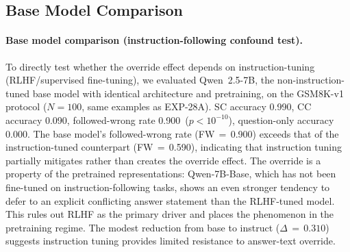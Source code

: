 \documentclass{article}
\theoremstyle{definition}
\theoremstyle{definition}
\newcommand{\QWSBVONEFW}{0.590}
\newcommand{\QBASEVONESCACC}{0.990}
\newcommand{\QBASEVONECCACC}{0.090}
\newcommand{\QBASEVONEFW}{0.900}
\newcommand{\QBASEVONEQOACC}{0.000}
\newcommand{\QBASEVONEN}{100}
\newcommand{\QBASEVONEPVAL}{$p{<}10^{-10}$}
\begin{document}
\subsection{Base Model Comparison}

\paragraph{Base model comparison (instruction-following confound test).}
To directly test whether the override effect depends on instruction-tuning (RLHF/supervised fine-tuning), we evaluated Qwen~2.5-7B, the non-instruction-tuned base model with identical architecture and pretraining, on the GSM8K-v1 protocol ($N{=}\QBASEVONEN$, same examples as EXP-28A). SC accuracy \QBASEVONESCACC, CC accuracy \QBASEVONECCACC, followed-wrong rate \QBASEVONEFW\ (\QBASEVONEPVAL), question-only accuracy \QBASEVONEQOACC.
The base model's followed-wrong rate (FW\,$=$\,\QBASEVONEFW) exceeds that of the instruction-tuned counterpart (FW\,$=$\,\QWSBVONEFW), indicating that instruction tuning partially mitigates rather than creates the override effect. The override is a property of the pretrained representations: Qwen-7B-Base, which has not been fine-tuned on instruction-following tasks, shows an even stronger tendency to defer to an explicit conflicting answer statement than the RLHF-tuned model. This rules out RLHF as the primary driver and places the phenomenon in the pretraining regime. The modest reduction from base to instruct ($\Delta\,=\,0.310$) suggests instruction tuning provides limited resistance to answer-text override.
\end{document}
